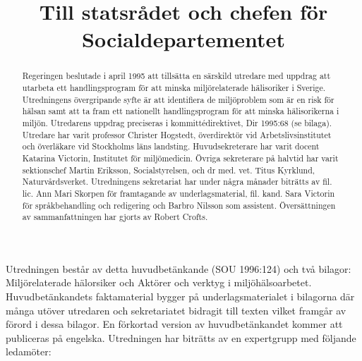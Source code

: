 \title{
Till statsrådet och chefen för Socialdepartementet
}
\begin{abstract}
Regeringen beslutade i april 1995 att tillsätta en särskild utredare med uppdrag att utarbeta ett handlingsprogram för att minska miljörelaterade hälisoriker i Sverige. Utredningens övergripande syfte är att identifiera de miljöproblem som är en risk för hälsan samt att ta fram ett nationellt handlingsprogram för att minska hälisorikerna i miljön. Utredarens uppdrag preciseras i kommittédirektivet, Dir 1995:68 (se bilaga).
Utredare har varit professor Christer Hogstedt, överdirektör vid Arbetslivsinstitutet och överläkare vid Stockholms läns landsting. Huvudsekreterare har varit docent Katarina Victorin, Institutet för miljömedicin. Övriga sekreterare på halvtid har varit sektionschef Martin Eriksson, Socialstyrelsen, och dr med. vet. Titus Kyrklund, Naturvårdsverket. Utredningens sekretariat har under några månader biträtts av fil. lic. Ann Mari Skorpen för framtagande av underlagsmaterial, fil. kand. Sara Victorin för språkbehandling och redigering och Barbro Nilsson som assistent. Översättningen av sammanfattningen har gjorts av Robert Crofts.
\end{abstract}
Utredningen består av detta huvudbetänkande (SOU 1996:124) och två bilagor: Miljörelaterade hälorsiker och Aktörer och verktyg i miljöhälsoarbetet. Huvudbetänkandets faktamaterial bygger på underlagsmaterialet i bilagorna där många utöver utredaren och sekretariatet bidragit till texten vilket framgår av förord i dessa bilagor. En förkortad version av huvudbetänkandet kommer att publiceras på engelska.
Utredningen har biträtts av en expertgrupp med följande ledamöter: